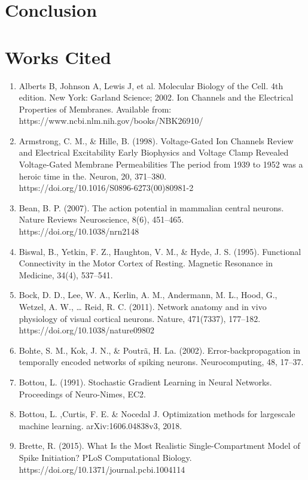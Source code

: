 \documentclass[11pt]{article}
\begin{document}
\section{Conclusion}

\section{Works Cited}


\begin{enumerate}
\item Alberts B, Johnson A, Lewis J, et al. Molecular Biology of the Cell. 4th edition. New York: Garland Science; 2002. Ion Channels and the Electrical Properties of Membranes. Available from: https://www.ncbi.nlm.nih.gov/books/NBK26910/
\item Armstrong, C. M., \& Hille, B. (1998). Voltage-Gated Ion Channels Review and Electrical Excitability Early Biophysics and Voltage Clamp Revealed Voltage-Gated Membrane Permeabilities The period from 1939 to 1952 was a heroic time in the. Neuron, 20, 371–380.\\ https://doi.org/10.1016/S0896-6273(00)80981-2
\item Bean, B. P. (2007). The action potential in mammalian central neurons. Nature Reviews Neuroscience, 8(6), 451–465. https://doi.org/10.1038/nrn2148
\item Biswal, B., Yetkin, F. Z., Haughton, V. M., \& Hyde, J. S. (1995). Functional Connectivity in the Motor Cortex of Resting. Magnetic Resonance in Medicine, 34(4), 537–541.
\item Bock, D. D., Lee, W. A., Kerlin, A. M., Andermann, M. L., Hood, G., Wetzel, A. W., … Reid, R. C. (2011). Network anatomy and in vivo physiology of visual cortical neurons. Nature, 471(7337), 177–182. https://doi.org/10.1038/nature09802
\item Bohte, S. M., Kok, J. N., \& Poutrã, H. La. (2002). Error-backpropagation in temporally encoded networks of spiking neurons. Neurocomputing, 48, 17–37.
\item Bottou, L. (1991). Stochastic Gradient Learning in Neural Networks. Proceedings of Neuro-Nimes, EC2.
\item Bottou, L. ,Curtis, F. E. \& Nocedal J. Optimization methods for largescale
machine learning. arXiv:1606.04838v3, 2018.
\item Brette, R. (2015). What Is the Most Realistic Single-Compartment Model of Spike Initiation? PLoS Computational Biology. https://doi.org/10.1371/journal.pcbi.1004114

\end{enumerate}
\end{document}
